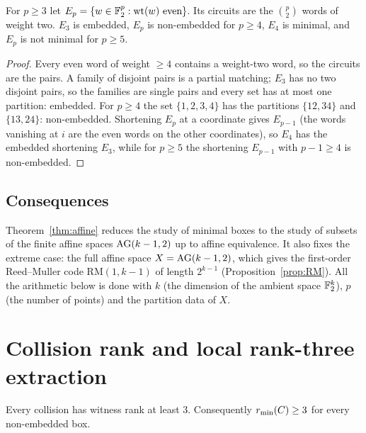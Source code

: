 
\begin{proposition}\label{prop:Emin}
For $p\ge3$ let $E_p=\{w\in\mathbb F_2^p:\operatorname{wt}(w)\text{ even}\}$. Its circuits are the $\binom p2$ words of weight two. $E_3$ is embedded, $E_p$ is non-embedded for $p\ge4$, $E_4$ is minimal, and $E_p$ is not minimal for $p\ge5$.
\end{proposition}

\begin{proof}
Every even word of weight $\ge4$ contains a weight-two word, so the circuits are the pairs. A family of disjoint pairs is a partial matching; $E_3$ has no two disjoint pairs, so the families are single pairs and every set has at most one partition: embedded. For $p\ge4$ the set $\{1,2,3,4\}$ has the partitions $\{12,34\}$ and $\{13,24\}$: non-embedded. Shortening $E_p$ at a coordinate gives $E_{p-1}$ (the words vanishing at $i$ are the even words on the other coordinates), so $E_4$ has the embedded shortening $E_3$, while for $p\ge5$ the shortening $E_{p-1}$ with $p-1\ge4$ is non-embedded.
\end{proof}

\subsection{Consequences}

Theorem~\ref{thm:affine} reduces the study of minimal boxes to the study of subsets of the finite affine spaces $\mathrm{AG}(k-1,2)$ up to affine equivalence. It also fixes the extreme case: the full affine space $X=\mathrm{AG}(k-1,2)$, which gives the first-order Reed--Muller code $\mathrm{RM}(1,k-1)$ of length $2^{k-1}$ (Proposition~\ref{prop:RM}). All the arithmetic below is done with $k$ (the dimension of the ambient space $\mathbb F_2^k$), $p$ (the number of points) and the partition data of $X$.

\section{Collision rank and local rank-three extraction}\label{sec:L5}

\begin{lemma}\label{lem:LOW}
Every collision has witness rank at least $3$. Consequently $r_{\min}(C)\ge3$ for every non-embedded box.
\end{lemma}

